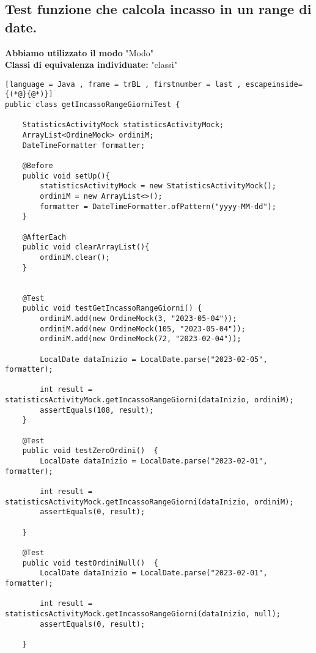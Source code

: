 \subsection{Test funzione che calcola incasso in un range di date.}
\begin{flushleft}
    \textbf{Abbiamo utilizzato il modo} "Modo"\\
    \textbf{Classi di equivalenza individuate:} "classi"
\end{flushleft}
\vspace{0.2cm}

\begin{lstlisting}[language = Java , frame = trBL , firstnumber = last , escapeinside={(*@}{@*)}]
public class getIncassoRangeGiorniTest {

    StatisticsActivityMock statisticsActivityMock;
    ArrayList<OrdineMock> ordiniM;
    DateTimeFormatter formatter;

    @Before
    public void setUp(){
        statisticsActivityMock = new StatisticsActivityMock();
        ordiniM = new ArrayList<>();
        formatter = DateTimeFormatter.ofPattern("yyyy-MM-dd");
    }

    @AfterEach
    public void clearArrayList(){
        ordiniM.clear();
    }


    @Test
    public void testGetIncassoRangeGiorni() {
        ordiniM.add(new OrdineMock(3, "2023-05-04"));
        ordiniM.add(new OrdineMock(105, "2023-05-04"));
        ordiniM.add(new OrdineMock(72, "2023-02-04"));

        LocalDate dataInizio = LocalDate.parse("2023-02-05", formatter);

        int result = statisticsActivityMock.getIncassoRangeGiorni(dataInizio, ordiniM);
        assertEquals(108, result);
    }

    @Test
    public void testZeroOrdini()  {
        LocalDate dataInizio = LocalDate.parse("2023-02-01", formatter);

        int result = statisticsActivityMock.getIncassoRangeGiorni(dataInizio, ordiniM);
        assertEquals(0, result);

    }

    @Test
    public void testOrdiniNull()  {
        LocalDate dataInizio = LocalDate.parse("2023-02-01", formatter);

        int result = statisticsActivityMock.getIncassoRangeGiorni(dataInizio, null);
        assertEquals(0, result);

    }


\end{lstlisting}
